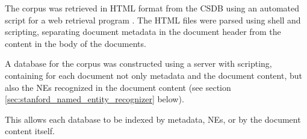 The corpus was retrieved in HTML format from the CSDB using an automated script for a web retrieval program \cite{wget}. The HTML files were parsed using shell and \citeauthor{python} scripting, separating document metadata in the document header from the content in the body of the documents.

A database for the corpus was constructed using a \citeauthor{MySQL} server with \citeauthor{perl} scripting, containing for each document not only metadata and the document content, but also the NEs recognized in the document content (see section \ref{sec:stanford_named_entity_recognizer} below).

This allows each database to be indexed by metadata, NEs, or by the document content itself.